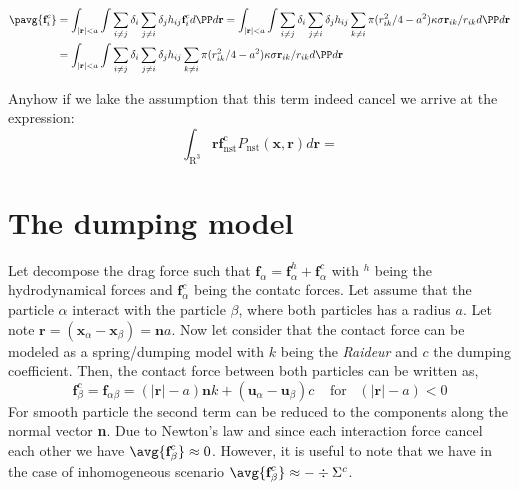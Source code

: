 \begin{align}    
\pavg{\textbf{f}_i^c}
&= \int_{|\textbf{r}|<a}
\int \sum_{i \neq j} \delta_i \sum_{j\neq i} \delta_j h_{ij}
\textbf{f}_i^c d\PP d\textbf{r}
= \int_{|\textbf{r}|<a}
\int \sum_{i \neq j} \delta_i \sum_{j\neq i} \delta_j h_{ij}
\sum_{k\neq i} \pi (r_{ik}^2/4 - a^2) \kappa \sigma \textbf{r}_{ik}/r_{ik} d\PP d\textbf{r}\\
&= \int_{|\textbf{r}|<a}
\int \sum_{i \neq j} \delta_i \sum_{j\neq i} \delta_j h_{ij}
\sum_{k\neq i} \pi (r_{ik}^2/4 - a^2) \kappa \sigma \textbf{r}_{ik}/r_{ik} d\PP d\textbf{r}
\\
\end{align}

Anyhow if we lake the assumption that this term indeed cancel we arrive at the expression: 
\begin{equation*}
    \int_{\mathrm{R}^3} \textbf{r} \textbf{f}_\text{nst}^\text{c} P_\text{nst}(\textbf{x},\textbf{r}) d\textbf{r}
    = 
\end{equation*}

\section{The dumping model}

Let decompose the drag force such that $\textbf{f}_\alpha = \textbf{f}_\alpha^h + \textbf{f}_\alpha^c$ with $^h$ being the hydrodynamical forces and $\textbf{f}^c_\alpha$ being the contatc forces. 
Let assume that the particle $\alpha$ interact with the particle $\beta$, where both particles has a radius $a$.
Let note $\textbf{r} = (\textbf{x}_\alpha - \textbf{x}_\beta) = \textbf{n} a$. 
Now let consider that the contact force can be modeled as a spring/dumping model with $k$ being the \textit{Raideur} and $c$ the dumping coefficient.
Then, the contact force between both particles can be written as, 
\begin{equation}
    \textbf{f}_\beta^c
    = \textbf{f}_{\alpha\beta}
    = (|\textbf{r}| - a) \textbf{n} k 
    + (\textbf{u}_\alpha - \textbf{u}_\beta) c
    \;\;\;\;\text{for} \;\;\; (|\textbf{r}| - a) < 0
\end{equation}
For smooth particle the second term can be reduced to the components along the normal vector \textbf{n}.  
Due to Newton's  law and since each interaction force cancel each other we have $\avg{\textbf{f}_\beta^c} \approx 0$. 
However, it is useful to note that we have in the case of inhomogeneous scenario $\avg{\textbf{f}_\beta^c} \approx - \div \Sigma^c$.

